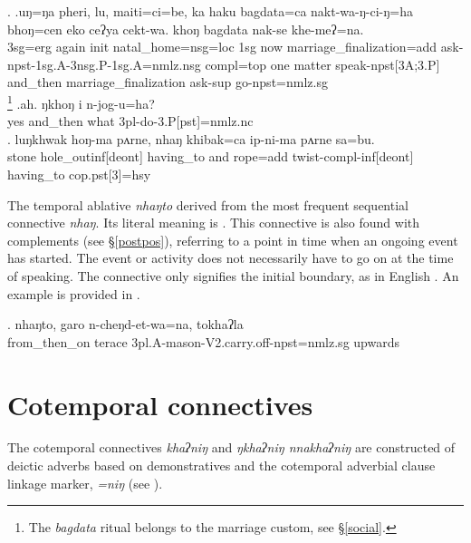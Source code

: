 \ex. \ag.uŋ=ŋa pheri, lu, maiti=ci=be, ka haku bagdata=ca nakt-wa-ŋ-ci-ŋ=ha bhoŋ=cen eko ceʔya cekt-wa. khoŋ bagdata  nak-se khe-meʔ=na.\\
{\sc 3sg=erg} again {\sc init} natal\_home{\sc =nsg=loc} {\sc 1sg} now marriage\_finalization{\sc =add} ask{\sc -npst-1sg.A-3nsg.P-1sg.A=nmlz.nsg} {\sc compl=top} one matter speak{\sc -npst[3A;3.P]} and\_then marriage\_finalization ask{\sc -sup} go{\sc [3]-npst=nmlz.sg}\\
\footnote{The \emph{bagdata} ritual belongs to the  marriage custom, see §\ref{social}.} 
\bg.ah.    ŋkhoŋ    i    n-jog-u=ha?\\
yes and\_then what {\sc 3pl-}do{\sc -3.P[pst]=nmlz.nc}\\
 
\bg. luŋkhwak hoŋ-ma                pʌrne, nhaŋ     khibak=ca        ip-ni-ma                       pʌrne    sa=bu.\\
stone hole\_out{\sc inf[deont]} having\_to and rope{\sc =add} twist{\sc -compl-inf[deont]} having\_to {\sc cop.pst[3]=hsy}\\
 


The  temporal ablative \emph{nhaŋto} derived from the most frequent sequential connective \emph{nhaŋ}. Its literal meaning is . This connective is also found with complements (see §\ref{postpos}), referring to a point in time when an ongoing event has started. The event or activity does not necessarily have to go on at the time of speaking. The connective only signifies the initial boundary, as in English . An example is provided in \Next.
 
\exg. nhaŋto, garo    n-cheŋd-et-wa=na,                             tokhaʔla\\
from\_then\_on terace {\sc 3pl.A-}mason{\sc -V2.carry.off-npst=nmlz.sg} upwards\\
 

\section{Cotemporal connectives} 

The cotemporal connectives \emph{khaʔniŋ} and \emph{ŋkhaʔniŋ \ti nnakhaʔniŋ} are constructed of deictic adverbs based on demonstratives and the cotemporal adverbial clause linkage marker, \emph{=niŋ} (see \Next).

